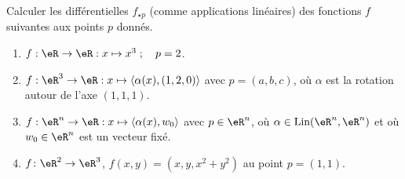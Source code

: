 
\begin{exercice}\label{exoSerieDeux0003}

Calculer les différentielles $f_{\star p}$ (comme applications linéaires) des fonctions $f$ suivantes aux points $p$ donnés.
\begin{enumerate}
	\item $f:\eR\to\eR:x\mapsto x^3\;;\quad p=2$.
	\item $f:\eR^3\to\eR:x\mapsto \langle \alpha(x),(1,2,0)\rangle$ avec $p=(a,b,c)$, où $\alpha$ est la rotation autour de l'axe $(1,1,1)$.
	\item $f:\eR^n\to\eR:x\mapsto \langle\alpha(x),w_0\rangle$ avec $p\in\eR^n$, où $\alpha\in\mbox{Lin}(\eR^n,\eR^n)$ et où $w_0\in\eR^n$ est un vecteur fixé.
	\item $f\colon \eR^2\to  \eR^3$, $f(x,y)=(x,y,x^2+y^2)$ au point $p=(1,1)$.
\end{enumerate}

\end{exercice}
